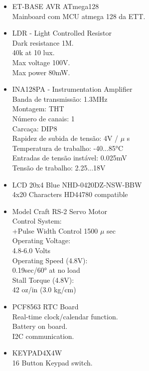 \begin{minipage}[t]{.60\linewidth}
	\begin{itemize}
		\setlength\itemsep{-0.3em}
		\item ET-BASE AVR ATmega128 \\
		Mainboard com MCU atmega 128 da ETT. \\
		\item LDR - Light Controlled Resistor \\
		Dark resistance 1M.\\
		40k at 10 lux.\\
		Max voltage 100V.\\
		Max power 80mW.\\
		\item INA128PA - Instrumentation Amplifier \\
		Banda de transmissão: 1.3MHz \\
		Montagem: THT \\
		Número de canais: 1 \\
		Carcaça: DIP8 \\
		Rapidez de subida de tensão: 4V / $\mu$ s \\
		Temperatura de trabalho: -40...85°C \\
		Entradas de tensão instável: 0.025mV \\
		Tensão de trabalho: 2.25...18V \\
		\item LCD 20x4 Blue NHD-0420DZ-NSW-BBW \\
		4x20 Characters HD44780 compatible\\
	\end{itemize}
\end{minipage}
\begin{minipage}[t]{.31\linewidth}
	\begin{itemize}
		\setlength\itemsep{-0.3em}
		\item Model Craft RS-2 \- Servo Motor \\
		Control System:\\
		+Pulse Width Control 1500 $\mu$ sec \\
		Operating Voltage:\\ 
		4.8-6.0 Volts \\
		Operating Speed (4.8V):\\
		0.19sec/60° at no load \\
		Stall Torque (4.8V):\\
		42 oz/in (3.0 kg/cm) \\
		\item PCF8563 RTC Board \\
		Real-time clock/calendar function. \\ 
		Battery on board. \\
		I2C communication. \\
		\item KEYPAD4X4W \\
		16 Button Keypad switch. \\
	\end{itemize}
\end{minipage}\\
